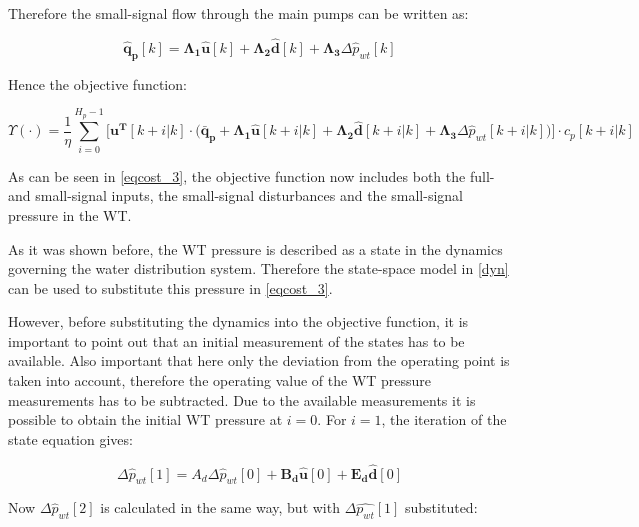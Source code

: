 Therefore the small-signal flow through the main pumps can be written as: 

 \begin{equation}
 \bm{\hat{q}_{p}}[k] =   \bm{\Lambda_1} \bm{\hat{u}}[k] + \bm{\Lambda_2} \bm{\hat{d}}[k] + \bm{\Lambda_3} \Delta \hat{p}_{wt}[k]
 \label{pumpflows_simplified}
\end{equation}

Hence the objective function:

\begin{equation}
\! \Upsilon(\cdot) \!=\! \frac{1}{\eta}\! \sum_{i=0}^{H_p-1}\! \Big[ \bm{u^T}[k+i|k] \cdot \Big(\bm{\bar{q}_p} +  \bm{\Lambda_1} \bm{\hat{u}}[k+i|k] + \bm{\Lambda_2} \bm{\hat{d}}[k+i|k] + \bm{\Lambda_3} \Delta \hat{p}_{wt}[k+i|k]\!\Big)\!\Big] \! \cdot c_p[k+i|k]
\label{eqcost_3} 
\end{equation}

As can be seen in \eqref{eqcost_3}, the objective function now includes both the full- and small-signal inputs, the small-signal disturbances and the small-signal pressure in the WT.

As it was shown before, the WT pressure is described as a state in the dynamics governing the water distribution system. Therefore the state-space model in \eqref{dyn} can be used to substitute this pressure in \eqref{eqcost_3}.

However, before substituting the dynamics into the objective function, it is important to point out that an initial measurement of the states has to be available. Also important that here only the deviation from the operating point is taken into account, therefore the operating value of the WT pressure measurements has to be subtracted. Due to the available measurements it is possible to obtain the initial WT pressure at $i = 0$. For $i = 1$, the iteration of the state equation gives:


\begin{equation}
	\Delta \hat p_{wt}[1] = A_d\Delta \hat p_{wt}[0] + \bm{B_d} \bm{\hat{u}}[0] + \bm{E_d} \bm{\hat{d}}[0]
\end{equation}

Now $\Delta \hat p_{wt}[2]$ is calculated in the same way, but with $\Delta \hat{p_{wt}}[1]$ substituted: 

